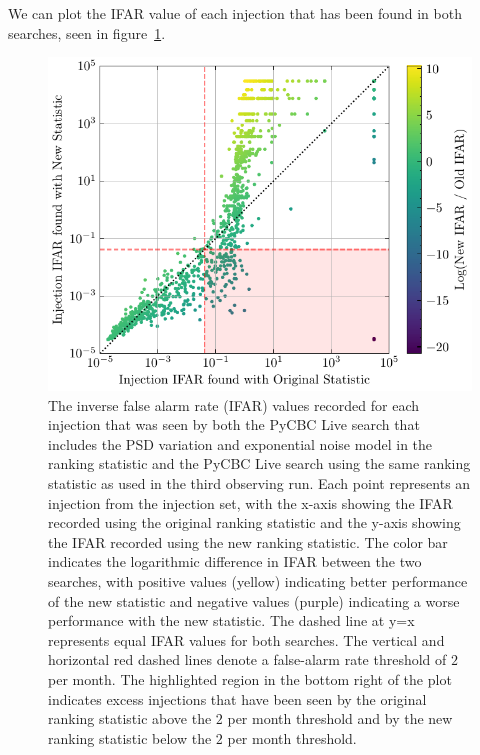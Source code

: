 We can plot the IFAR value of each injection that has been found in both searches, seen in 
figure~\ref{5:fig:ifar-ifar-fits-psdvar-shaded}.
%
\begin{figure}
      \centering
    \includegraphics[width=1.0\textwidth]{images/5_pycbclive/fits-psd/fits_psd_ifar_vs_ifar_shaded_region.pdf}
    \caption{The inverse false alarm rate (IFAR) values recorded for each injection that was seen by both the PyCBC Live search that includes the PSD variation and exponential noise model in the ranking statistic and the PyCBC Live search using the same ranking statistic as used in the third observing run. Each point represents an injection from the injection set, with the x-axis showing the IFAR recorded using the original ranking statistic and the y-axis showing the IFAR recorded using the new ranking statistic. The color bar indicates the logarithmic difference in IFAR between the two searches, with positive values (yellow) indicating better performance of the new statistic and negative values (purple) indicating a worse performance with the new statistic. The dashed line at y=x represents equal IFAR values for both searches. The vertical and horizontal red dashed lines denote a false-alarm rate threshold of $2$ per month. The highlighted region in the bottom right of the plot indicates excess injections that have been seen by the original ranking statistic above the $2$ per month threshold and by the new ranking statistic below the $2$ per month threshold.}
    \label{5:fig:ifar-ifar-fits-psdvar-shaded}
\end{figure}
